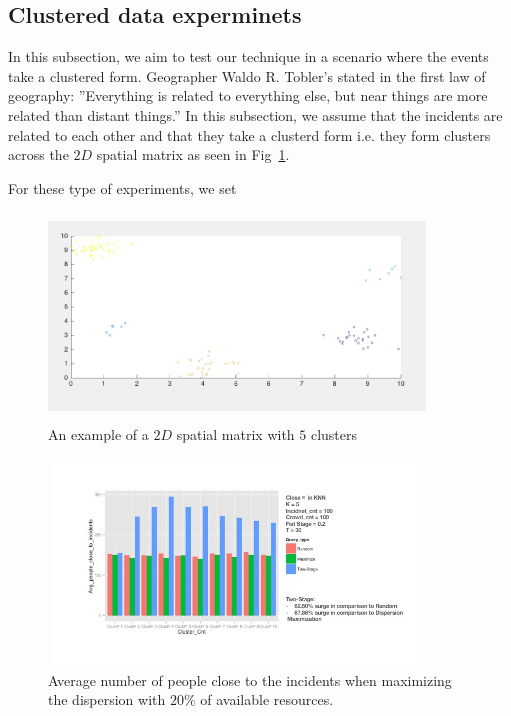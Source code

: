 \documentclass{acm_proc_article-sp}
\begin{document}
\subsection{Clustered data experminets}
In this subsection, we aim to test our technique in a scenario where the events take a clustered form. Geographer Waldo R. Tobler's stated in the first law of geography: ''Everything is related to everything else, but near things are more related than distant things.'' In this subsection, we assume that the incidents are related to each other and that they take a clusterd form i.e. they form clusters across the $2D$ spatial matrix as seen in Fig~\ref{fig: clust}. \par
For these type of experiments, we set 


\begin{figure}[!htb]
\centering
   \includegraphics[width=10cm ,height=5.5cm]{figuresPng/clust.png}
   \caption{An example of a $2D$ spatial matrix with $5$ clusters }\label{fig: clust}
\end{figure}

\begin{figure}[!htb]
\centering
   \includegraphics[width=10cm ,height=5.5cm]{figuresPng/FirstStageTwentyPerc}
   \caption{Average number of people close to the incidents when maximizing the dispersion with $20\%$ of available resources. }\label{fig: heatMap}
\end{figure}
\end{document}
